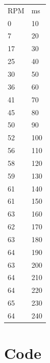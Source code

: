 \documentclass{article}
\begin{document}
\begin{tabular}{ll}
RPM & ms \\
0           & 10        \\
7           & 20        \\
17          & 30        \\
25          & 40        \\
30          & 50        \\
36          & 60        \\
41          & 70        \\
45          & 80        \\
50          & 90        \\
52          & 100       \\
56          & 110       \\
58          & 120       \\
59          & 130       \\
61          & 140       \\
61          & 150       \\
63          & 160       \\
62          & 170       \\
63          & 180       \\
64          & 190       \\
63          & 200       \\
64          & 210       \\
64          & 220       \\
65          & 230       \\
64          & 240      
\end{tabular}

\newpage
\section{Code}\label{appendix:code}






\end{document}
